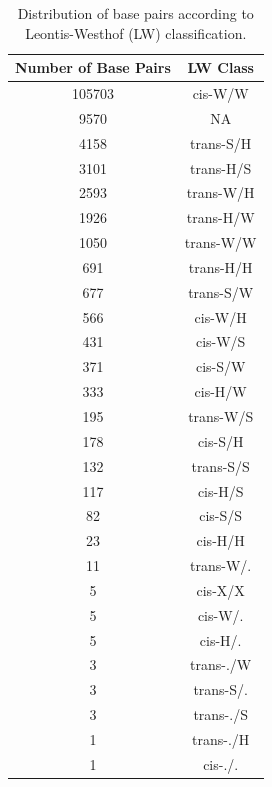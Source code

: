 \begin{center}
\begin{longtable}{c|c}
\caption{Distribution of base pairs according to Leontis-Westhof (LW) classification.}\\ \hline
\bf{Number of Base Pairs} & \bf{LW Class} \\ \hline \hline
 105703 & cis-W/W     \\ \hline
   9570 & NA          \\ \hline
   4158 & trans-S/H   \\ \hline
   3101 & trans-H/S   \\ \hline
   2593 & trans-W/H   \\ \hline
   1926 & trans-H/W   \\ \hline
   1050 & trans-W/W   \\ \hline
    691 & trans-H/H   \\ \hline
    677 & trans-S/W   \\ \hline
    566 & cis-W/H     \\ \hline
    431 & cis-W/S     \\ \hline
    371 & cis-S/W     \\ \hline
    333 & cis-H/W     \\ \hline
    195 & trans-W/S   \\ \hline
    178 & cis-S/H     \\ \hline
    132 & trans-S/S   \\ \hline
    117 & cis-H/S     \\ \hline
     82 & cis-S/S     \\ \hline
     23 & cis-H/H     \\ \hline
     11 & trans-W/.   \\ \hline
      5 & cis-X/X     \\ \hline
      5 & cis-W/.     \\ \hline
      5 & cis-H/.     \\ \hline
      3 & trans-./W   \\ \hline
      3 & trans-S/.   \\ \hline
      3 & trans-./S   \\ \hline
      1 & trans-./H   \\ \hline
      1 & cis-./.     \\ \hline
\end{longtable}
\end{center}


